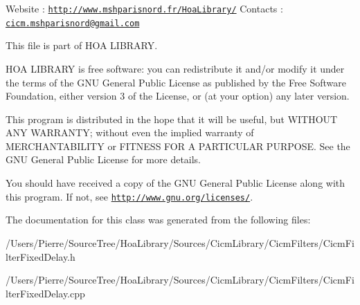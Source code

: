 Website \-: \href{http://www.mshparisnord.fr/HoaLibrary/}{\tt http\-://www.\-mshparisnord.\-fr/\-Hoa\-Library/} Contacts \-: \href{mailto:cicm.mshparisnord@gmail.com}{\tt cicm.\-mshparisnord@gmail.\-com}

This file is part of H\-O\-A L\-I\-B\-R\-A\-R\-Y.

H\-O\-A L\-I\-B\-R\-A\-R\-Y is free software\-: you can redistribute it and/or modify it under the terms of the G\-N\-U General Public License as published by the Free Software Foundation, either version 3 of the License, or (at your option) any later version.

This program is distributed in the hope that it will be useful, but W\-I\-T\-H\-O\-U\-T A\-N\-Y W\-A\-R\-R\-A\-N\-T\-Y; without even the implied warranty of M\-E\-R\-C\-H\-A\-N\-T\-A\-B\-I\-L\-I\-T\-Y or F\-I\-T\-N\-E\-S\-S F\-O\-R A P\-A\-R\-T\-I\-C\-U\-L\-A\-R P\-U\-R\-P\-O\-S\-E. See the G\-N\-U General Public License for more details.

You should have received a copy of the G\-N\-U General Public License along with this program. If not, see \href{http://www.gnu.org/licenses/}{\tt http\-://www.\-gnu.\-org/licenses/}. 

The documentation for this class was generated from the following files\-:\begin{DoxyCompactItemize}
\item 
/\-Users/\-Pierre/\-Source\-Tree/\-Hoa\-Library/\-Sources/\-Cicm\-Library/\-Cicm\-Filters/Cicm\-Filter\-Fixed\-Delay.\-h\item 
/\-Users/\-Pierre/\-Source\-Tree/\-Hoa\-Library/\-Sources/\-Cicm\-Library/\-Cicm\-Filters/Cicm\-Filter\-Fixed\-Delay.\-cpp\end{DoxyCompactItemize}
